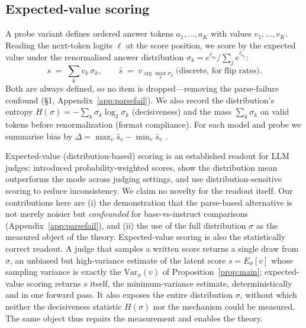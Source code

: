 \documentclass[11pt]{article}
\begin{document}
\subsection{Expected-value scoring}\label{sec:evs}
A probe variant defines ordered answer tokens $a_1,\dots,a_K$ with values
$v_1,\dots,v_K$. Reading the next-token logits $\ell$ at the score position, we score
by the expected value under the renormalized answer distribution
$\sigma_k = e^{\ell_{a_k}}/\sum_j e^{\ell_{a_j}}$:
\[
s \;=\; \textstyle\sum_k v_k\,\sigma_k, \qquad
\hat s \;=\; v_{\arg\max_k \sigma_k}\ \text{(discrete, for flip rates)} .
\]
Both are always defined, so no item is dropped---removing the parse-failure confound
(\S1, Appendix~\ref{app:parsefail}). We also record the distribution's entropy
$H(\sigma)=-\sum_k\sigma_k\log_2\sigma_k$ (decisiveness) and the mass $\sum_k\sigma_k$
on valid tokens before renormalization (format compliance). For each model and probe
we summarise bias by $\Delta=\max_v \bar s_v-\min_v \bar s_v$ \citep{li2025scoring}.

Expected-value (distribution-based) scoring is an established readout for LLM judges:
\citet{liu2023geval} introduced probability-weighted scores, \citet{wang2025judgmentdist}
show the distribution mean outperforms the mode across judging settings, and
\citet{trustjudge2025} use distribution-sensitive scoring to reduce inconsistency. We
claim no novelty for the readout itself. Our contributions here are (i) the demonstration
that the parse-based alternative is not merely noisier but \emph{confounded} for
base-vs-instruct comparisons (Appendix~\ref{app:parsefail}), and (ii) the use of the full
distribution $\sigma$ as the measured object of the theory. Expected-value scoring is
also the statistically correct readout. A judge that samples a written score returns a single draw from $\sigma$, an
unbiased but high-variance estimate of the latent score $s=E_\sigma[v]$ whose sampling
variance is exactly the $\mathrm{Var}_\sigma(v)$ of Proposition~\ref{prop:main};
expected-value scoring returns $s$ itself, the minimum-variance estimate, deterministically
and in one forward pass. It also exposes the entire distribution $\sigma$, without which
neither the decisiveness statistic $H(\sigma)$ nor the mechanism could be measured. The
same object thus repairs the measurement and enables the theory.
\end{document}

